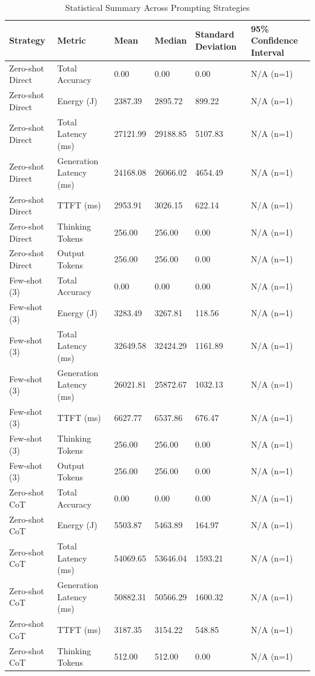 \begin{table}
\caption{Statistical Summary Across Prompting Strategies}
\label{tab:statistical_summary}
\begin{tabular}{llllll}
\toprule
Strategy & Metric & Mean & Median & Standard Deviation & 95\% Confidence Interval \\
\midrule
Zero-shot Direct & Total Accuracy & 0.00 & 0.00 & 0.00 & N/A (n=1) \\
Zero-shot Direct & Energy (J) & 2387.39 & 2895.72 & 899.22 & N/A (n=1) \\
Zero-shot Direct & Total Latency (ms) & 27121.99 & 29188.85 & 5107.83 & N/A (n=1) \\
Zero-shot Direct & Generation Latency (ms) & 24168.08 & 26066.02 & 4654.49 & N/A (n=1) \\
Zero-shot Direct & TTFT (ms) & 2953.91 & 3026.15 & 622.14 & N/A (n=1) \\
Zero-shot Direct & Thinking Tokens & 256.00 & 256.00 & 0.00 & N/A (n=1) \\
Zero-shot Direct & Output Tokens & 256.00 & 256.00 & 0.00 & N/A (n=1) \\
Few-shot (3) & Total Accuracy & 0.00 & 0.00 & 0.00 & N/A (n=1) \\
Few-shot (3) & Energy (J) & 3283.49 & 3267.81 & 118.56 & N/A (n=1) \\
Few-shot (3) & Total Latency (ms) & 32649.58 & 32424.29 & 1161.89 & N/A (n=1) \\
Few-shot (3) & Generation Latency (ms) & 26021.81 & 25872.67 & 1032.13 & N/A (n=1) \\
Few-shot (3) & TTFT (ms) & 6627.77 & 6537.86 & 676.47 & N/A (n=1) \\
Few-shot (3) & Thinking Tokens & 256.00 & 256.00 & 0.00 & N/A (n=1) \\
Few-shot (3) & Output Tokens & 256.00 & 256.00 & 0.00 & N/A (n=1) \\
Zero-shot CoT & Total Accuracy & 0.00 & 0.00 & 0.00 & N/A (n=1) \\
Zero-shot CoT & Energy (J) & 5503.87 & 5463.89 & 164.97 & N/A (n=1) \\
Zero-shot CoT & Total Latency (ms) & 54069.65 & 53646.04 & 1593.21 & N/A (n=1) \\
Zero-shot CoT & Generation Latency (ms) & 50882.31 & 50566.29 & 1600.32 & N/A (n=1) \\
Zero-shot CoT & TTFT (ms) & 3187.35 & 3154.22 & 548.85 & N/A (n=1) \\
Zero-shot CoT & Thinking Tokens & 512.00 & 512.00 & 0.00 & N/A (n=1) \\

\end{tabular}
\end{table}
